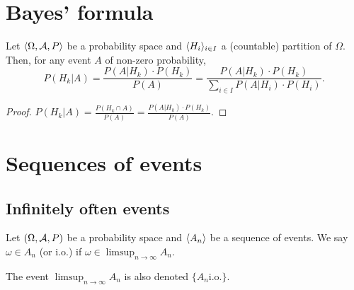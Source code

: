 \section{Bayes' formula}
\begin{theorem}
Let $\langle \Omega, \mathcal{A}, P \rangle$ be a probability space and $\langle H_i \rangle_{i\in I}$ a (countable) partition of $\Omega$. Then, for any event $A$ of non-zero probability,
\[ P(H_k|A ) = \frac{P(A|H_k)\cdot P(H_k)}{P(A)} = \frac{P(A|H_k)\cdot P(H_k)}{\sum_{i\in I}P(A|H_i)\cdot P(H_i)}. \]
\end{theorem}
\begin{proof}
$P(H_k|A) = \frac{P(H_k \cap A)}{P(A)} = \frac{P(A|H_k)\cdot P(H_k)}{P(A)}$.
\end{proof}

\section{Sequences of events}
\subsection{Infinitely often events}
\begin{definition}
Let $\left( \Omega, \mathcal{A}, P \right)$ be a probability space and $\langle A_n \rangle$ be a sequence of events. We say $\omega \in A_n$  (or i.o.) if $\omega\in \limsup_{n\to\infty}A_n$.

The event $\limsup_{n\to\infty}A_n$ is also denoted $\{A_n \text{i.o.}\}$.
\end{definition}
